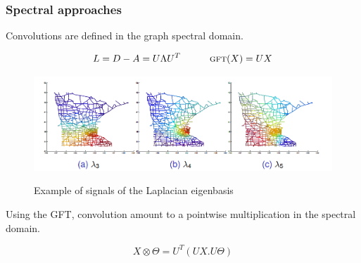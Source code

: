 \documentclass[t,9pt,pdftex]{beamer}
\theoremstyle{definition}
\begin{document}
\begin{frame}[c, label=current]
  \frametitle{Spectral approaches}
  Convolutions are defined in the graph spectral domain.
  \begin{Large}
  $$
  L = D - A = U \Lambda U^T \quad \quad \quad \textsc{gft}(X) = UX
  $$
  \end{Large}
  \vspace{-0.4in}
  \begin{figure}
  \begin{center}
  \includegraphics[width=0.8\linewidth,height=\textheight,keepaspectratio]{mines2.png}\\
  \end{center}
  \caption{Example of signals of the Laplacian eigenbasis}
  \end{figure}
  Using the GFT, convolution amount to a pointwise multiplication in the spectral domain.
  \begin{Large}
  $$
  X \otimes \Theta = U^T(UX . U\Theta)
  $$
  \end{Large}
\end{frame}
\end{document}
